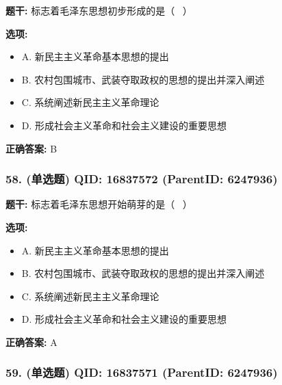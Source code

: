 \documentclass[12pt,UTF8]{ctexart}
\begin{document}
\textbf{题干:}
标志着毛泽东思想初步形成的是（  ）



\textbf{选项:}
\begin{itemize}[leftmargin=*]

  \item A. 新民主主义革命基本思想的提出

  \item B. 农村包围城市、武装夺取政权的思想的提出并深入阐述

  \item C. 系统阐述新民主主义革命理论

  \item D. 形成社会主义革命和社会主义建设的重要思想

\end{itemize}

\textbf{正确答案:}
B

\vspace{0.3em}\hrulefill\vspace{0.7em}

\subsubsection*{58. (单选题) \small QID: 16837572 (ParentID: 6247936)}

\textbf{题干:}
标志着毛泽东思想开始萌芽的是（  ）



\textbf{选项:}
\begin{itemize}[leftmargin=*]

  \item A. 新民主主义革命基本思想的提出

  \item B. 农村包围城市、武装夺取政权的思想的提出并深入阐述

  \item C. 系统阐述新民主主义革命理论

  \item D. 形成社会主义革命和社会主义建设的重要思想

\end{itemize}

\textbf{正确答案:}
A

\vspace{0.3em}\hrulefill\vspace{0.7em}

\subsubsection*{59. (单选题) \small QID: 16837571 (ParentID: 6247936)}
\end{document}
